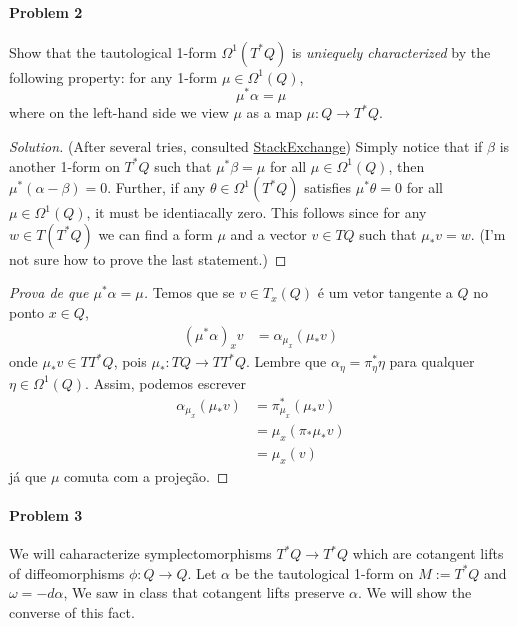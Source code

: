 \paragraph{Problem 2} Show that the tautological 1-form $\Omega^{1}(T^*Q)$ is \textit{uniequely characterized} by the following property: for any 1-form $\mu\in\Omega^{1}(Q)$,
\[\mu^*\alpha=\mu\]
where on the left-hand side we view  $\mu$ as a map $\mu:Q\to T^*Q$.

\begin{proof}[Solution]\leavevmode
	(After several tries, consulted \href{https://math.stackexchange.com/questions/4141107/a-characterization-of-the-tautological-form-liouville-1-form-on-the-cotangent}{StackExchange}) Simply notice that if $\beta$ is another 1-form on  $T^*Q$ such that $\mu^*\beta=\mu$ for all $\mu\in\Omega^{1}(Q)$, then  $\mu^*(\alpha-\beta)=0$. Further, if any  $\theta\in\Omega^{1}(T^*Q)$ satisfies $\mu^*\theta=0$ for all $\mu\in\Omega^{1}(Q)$, it must be identiacally zero. This follows since for any $w\in T(T^*Q)$ we can find a form $\mu$ and a vector $v\in TQ$ such that $\mu_*v=w$. (I'm not sure how to prove the last statement.)
\end{proof}


\begin{proof}[Prova de que $\mu^*\alpha=\mu$]\leavevmode
	Temos que se $v\in T_x(Q)$ \'e um vetor tangente a $Q$ no ponto $x\in Q$,
	\begin{align*}
		(\mu^*\alpha)_xv&=\alpha_{\mu_x}(\mu_*v)
	\end{align*}
	onde $\mu_*v\in T T^*Q$, pois $\mu_*:TQ\to  T T^*Q$. Lembre que $\alpha_\eta=\pi^*_{\eta}\eta$ para qualquer $\eta\in\Omega^{1}(Q)$. Assim, podemos escrever
	\begin{align*}
		\alpha_{\mu_x}(\mu_*v)&=\pi_{\mu_x}^*(\mu_{*}v)\\
		& =\mu_x(\pi_{*}\mu_*v)\\
		&=\mu_x(v)
	\end{align*}
	j\'a que $\mu$ comuta com a proje\c c\~ao.
\end{proof}

\paragraph{Problem 3} We will caharacterize symplectomorphisms $T^*Q\to T^*Q$ which are cotangent lifts of diffeomorphisms $\phi:Q\to Q$. Let $\alpha$ be the tautological 1-form on $M:=T^*Q$ and $\omega=-d\alpha$, We saw in class that cotangent lifts preserve  $\alpha$. We will show the converse of this fact.

